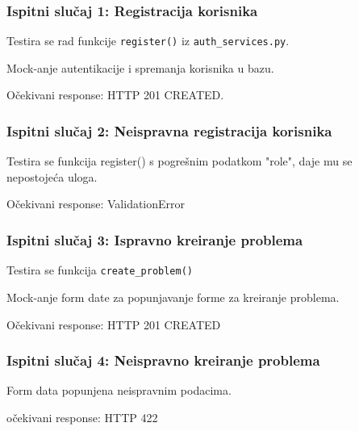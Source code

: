 			\subsubsection{Ispitni slučaj 1: Registracija korisnika}
				\begin{packed_item}
					
					\item Testira se rad funkcije \texttt{register()} iz \texttt{auth\_services.py}.
					\item Mock-anje autentikacije i spremanja korisnika u bazu.
					\item Očekivani response: HTTP 201 CREATED.
				\end{packed_item}
				
			\subsubsection{Ispitni slučaj 2: Neispravna registracija korisnika}
				\begin{packed_item}
					\item Testira se funkcija register() s pogrešnim podatkom "role", daje mu se nepostojeća uloga.
					\item Očekivani response: ValidationError
				\end{packed_item}
			
			\subsubsection{Ispitni slučaj 3: Ispravno kreiranje problema}
				\begin{packed_item}
					\item Testira se funkcija \texttt{create\_problem()}
					\item Mock-anje form date za popunjavanje forme za kreiranje problema.
					\item Očekivani response: HTTP 201 CREATED
				\end{packed_item}
			
			\subsubsection{Ispitni slučaj 4: Neispravno kreiranje problema}
				\begin{packed_item}
					\item Form data popunjena neispravnim podacima.
					\item očekivani response: HTTP 422
			 	\end{packed_item}	
			 	
